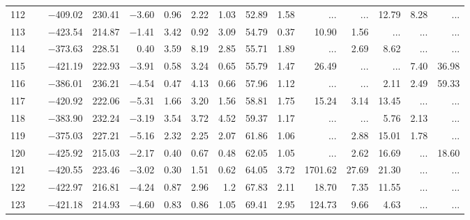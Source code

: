 \begin{table*}[p]
{\begin{tabular}{l@{ }r@{ \ }rr@{ \ }rr@{ \ }rrrr@{ \ }r@{ \ }r@{ \ }r@{ \ }r}
112   \ \dotfill \  &  $-$409.02 &    230.41 &  $-$3.60 &   0.96 &    2.22 &   1.03&   52.89 &   1.58&    ...     &    ...     &       12.79 &        8.28 &    ...       \\     
113   \ \dotfill \  &  $-$423.54 &    214.87 &  $-$1.41 &   3.42 &    0.92 &   3.09&   54.79 &   0.37&       10.90 &        1.56 &    ...     &    ...     &    ...       \\     
114   \ \dotfill \  &  $-$373.63 &    228.51 &    0.40 &   3.59 &    8.19 &   2.85&   55.71 &   1.89 &    ...     &        2.69 &        8.62 &    ...     &    ...       \\     
115   \ \dotfill \  &  $-$421.19 &    222.93 &  $-$3.91 &   0.58 &    3.24 &   0.65&   55.79 &   1.47&       26.49 &    ...     &    ...     &        7.40 &       36.98   \\     
116   \ \dotfill \  &  $-$386.01 &    236.21 &  $-$4.54 &   0.47 &    4.13 &   0.66&   57.96 &   1.12&    ...     &    ...     &        2.11 &        2.49 &       59.33   \\     
117   \ \dotfill \  &  $-$420.92 &    222.06 &  $-$5.31 &   1.66 &    3.20 &   1.56&   58.81 &   1.75&       15.24 &        3.14 &       13.45 &    ...     &    ...       \\     
118   \ \dotfill \  &  $-$383.90 &    232.24 &  $-$3.19 &   3.54 &    3.72 &   4.52&   59.37 &   1.17&    ...     &    ...     &        5.76 &        2.13 &    ...       \\     
119   \ \dotfill \  &  $-$375.03 &    227.21 &  $-$5.16 &   2.32 &    2.25 &   2.07&   61.86 &   1.06&    ...     &        2.88 &       15.01 &        1.78 &    ...       \\     
120   \ \dotfill \  &  $-$425.92 &    215.03 &  $-$2.17 &   0.40 &    0.67 &   0.48&   62.05 &   1.05&    ...     &        2.62 &       16.69 &    ...     &       18.60   \\     
121   \ \dotfill \  &  $-$420.55 &    223.46 &  $-$3.02 &   0.30 &    1.51 &   0.62&   64.05 &   3.72&     1701.62 &       27.69 &       21.30 &    ...     &    ...       \\     
122   \ \dotfill \  &  $-$422.97 &    216.81 &  $-$4.24 &   0.87 &    2.96 &   1.2 &   67.83 &   2.11 &       18.70 &        7.35 &       11.55 &    ...     &    ...       \\     
123   \ \dotfill \  &  $-$421.18 &    214.93 &  $-$4.60 &   0.83 &    0.86 &   1.05&   69.41 &   2.95 &      124.73 &        9.66 &        4.63 &    ...     &    ...       \\     
\hline
\end{tabular}
}


\end{table*}
